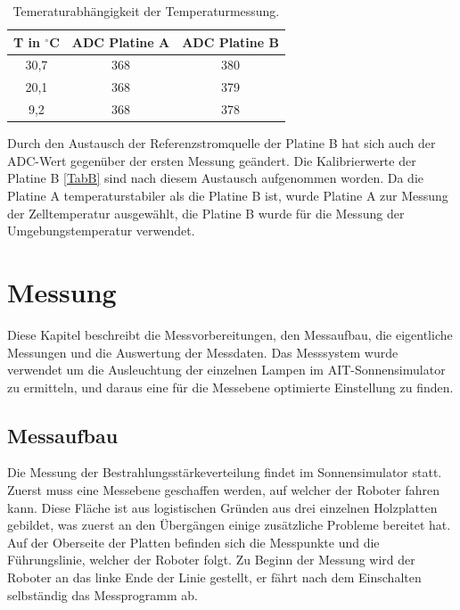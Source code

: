 \documentclass[a4paper,bibtotoc,oneside]{scrbook}
\begin{document}
\begin{table}[htbp]
\centering
\begin{tabular}{ | c | c | c |}\hline
{\bf T in $^{\circ}$C} & {\bf ADC Platine A} & {\bf ADC Platine B}\\ \hline
\hline
30,7 & 368 & 380\\ \hline
20,1 & 368 & 379\\ \hline
9,2 & 368 & 378\\ \hline
\end{tabular}
\caption{Temeraturabhängigkeit der Temperaturmessung.}\label{TabT2}
\end{table}

\noindent Durch den Austausch der Referenzstromquelle der Platine B hat sich auch der ADC-Wert gegenüber der ersten Messung geändert. Die Kalibrierwerte der Platine B \ref{TabB} sind nach diesem Austausch aufgenommen worden.
Da die Platine A temperaturstabiler als die Platine B ist, wurde Platine A zur Messung der Zelltemperatur ausgewählt, die Platine B wurde für die Messung der Umgebungstemperatur verwendet. 

\chapter{Messung}\thispagestyle{empty}

Diese Kapitel beschreibt die Messvorbereitungen, den Messaufbau, die eigentliche Messungen und die Auswertung der Messdaten. Das Messsystem wurde verwendet um die Ausleuchtung der einzelnen Lampen im AIT-Sonnensimulator zu ermitteln, und daraus eine für die Messebene optimierte Einstellung zu finden.

\section{Messaufbau}\thispagestyle{empty}
Die Messung der Bestrahlungsstärkeverteilung findet im Sonnensimulator statt. Zuerst muss eine Messebene geschaffen werden, auf welcher der Roboter fahren kann. Diese Fläche ist aus logistischen Gründen aus drei einzelnen Holzplatten gebildet, was zuerst an den Übergängen einige zusätzliche Probleme bereitet hat. Auf der Oberseite der Platten befinden sich die Messpunkte und die Führungslinie, welcher der Roboter folgt. Zu Beginn der Messung wird der Roboter an das linke Ende der Linie gestellt, er fährt nach dem Einschalten selbständig das Messprogramm ab.
\end{document}
